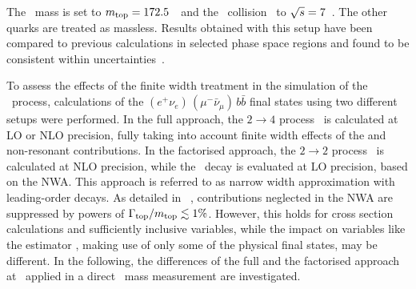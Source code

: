 %
%
%
The \tquark\ mass is set to $m_{\mathrm{top}}=172.5$~\GeV\ and the \pp\ collision \cme\ to ${\sqrt{s}}=7$~\TeV.
%
The other quarks are treated as massless. 
%
%
%
Results obtained with this setup have been compared to previous calculations in selected phase space regions and found to be consistent within uncertainties~\cite{Denner:2012yc}.
%



To assess the effects of the finite width treatment in the simulation of the \ttbar\ process, calculations of the $(e^+ \nu_e)\,(\mu^- \bar{\nu}_{\mu})\,b\bar{b}$ final states using two different setups were performed. 
%
In the full approach, the $2\to4$ process \ppWWbb\ is calculated at \gls{LO} or \gls{NLO} precision, fully taking into account finite width effects of the  and non-resonant contributions. 
%
In the factorised approach, the $2\to2$ process \ppttbar\ is calculated at \gls{NLO} precision, while the \ttbar\ decay is evaluated at \gls{LO} precision, based on the \gls{NWA}. This approach is referred to as narrow width approximation with leading-order decays.
%
As detailed in ~\cite{Heinrich2014}, contributions neglected in the \gls{NWA} are suppressed by powers of $\Gamma_{\mathrm{top}}/m_{\mathrm{top}}\lesssim1\%$. However, this holds for cross section calculations and sufficiently inclusive variables, while the impact on variables like the estimator \mlb, making use of only some of the physical final states, may be different. 
%
In the following, the differences of the full and the factorised approach at \genlevel\ applied in a direct \tquark\ mass measurement are investigated.







